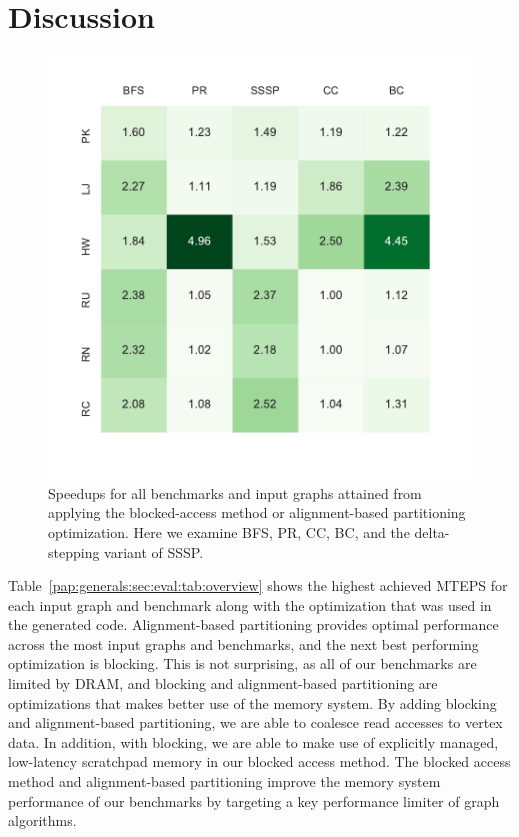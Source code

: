 \section{Discussion}\label{sec:discussion}


\overviewResultsTable

\begin{figure}[h]
    \centering
    \includegraphics[scale=0.8]{graphit-figures/heatmap.pdf}
    \caption{Speedups for all benchmarks and input graphs attained from applying the blocked-access method or alignment-based partitioning optimization. Here we examine BFS, PR, CC, BC, and the delta-stepping variant of SSSP.}
    \label{pap:generals:sec:eval:fig:heatmap}
\end{figure}

Table~\ref{pap:generals:sec:eval:tab:overview} shows the highest achieved MTEPS for each input graph and benchmark along with the optimization that was used in the generated code.
Alignment-based partitioning provides optimal performance across the most input graphs and benchmarks, and the next best performing optimization is blocking.
This is not surprising, as all of our benchmarks are limited by DRAM, and blocking and alignment-based partitioning are optimizations that makes better use of the memory system.
By adding blocking and alignment-based partitioning, we are able to coalesce read accesses to vertex data.
In addition, with blocking, we are able to make use of explicitly managed, low-latency scratchpad memory in our blocked access method. 
The blocked access method and alignment-based partitioning improve the memory system performance of our benchmarks by targeting a key performance limiter of graph algorithms.

